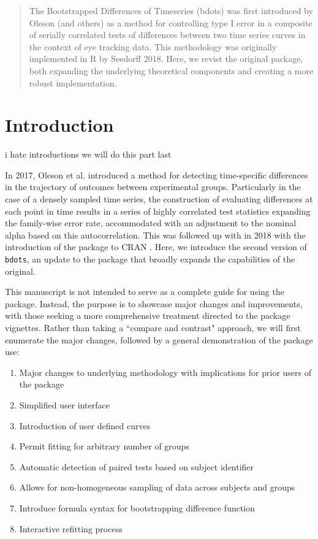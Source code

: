 
%

\begin{abstract}
The Bootstrapped Differences of Timeseries (bdots) was first introduced by Oleson (and others) as a method for controlling type I error in a composite of serially correlated tests of differences between two time series curves in the context of eye tracking data.  This methodology was originally implemented in R by Seedorff 2018. Here, we revist the original package, both expanding the underlying theoretical components and creating a more robust implementation.
\end{abstract}


\section{Introduction}

i hate introductions we will do this part last

In 2017, Oleson et al. introduced a method for detecting time-specific differences in the trajectory of outcomes between experimental groups. Particularly in the case of a densely sampled time series, the construction of evaluating differences at each point in time results in a series of highly correlated test statistics expanding the family-wise error rate, accommodated with an adjustment to the nominal alpha based on this autocorrelation. This was followed up with in 2018 with the introduction of the  package to CRAN \cite{seedorff2018bdots}. Here, we introduce the second version of \texttt{bdots}, an update to the package that broadly expands the capabilities of the original. 

This manuscript is not intended to serve as a complete guide for using the  package. Instead, the purpose is to showcase major changes and improvements, with those seeking a more comprehensive treatment directed to the package vignettes. Rather than taking a ``compare and contrast" approach, we will first enumerate the major changes, followed by a general demonstration of the package use:

\begin{singlespace}
\begin{enumerate}
\item Major changes to underlying methodology with implications for prior users of the package
\item Simplified user interface
\item Introduction of user defined curves
\item Permit fitting for arbitrary number of groups
\item Automatic detection of paired tests based on subject identifier
\item Allows for non-homogeneous sampling of data across subjects and groups
\item Introduce formula syntax for bootstrapping difference function
\item Interactive refitting process
\end{enumerate}
\end{singlespace}

